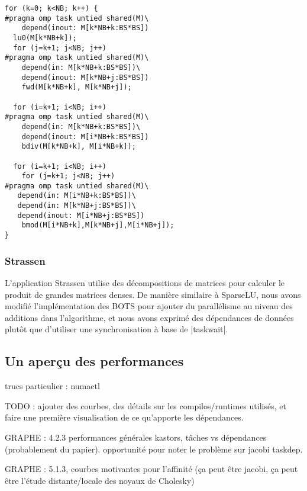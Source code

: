 \begin{lstlisting}[caption=LU utilisant des tâches avec dépendances,label=lst:kastors:sparseLU-deps]
for (k=0; k<NB; k++) {
#pragma omp task untied shared(M)\
    depend(inout: M[k*NB+k:BS*BS])
  lu0(M[k*NB+k]);
  for (j=k+1; j<NB; j++)
#pragma omp task untied shared(M)\
    depend(in: M[k*NB+k:BS*BS])\
    depend(inout: M[k*NB+j:BS*BS])
    fwd(M[k*NB+k], M[k*NB+j]);

  for (i=k+1; i<NB; i++)
#pragma omp task untied shared(M)\
    depend(in: M[k*NB+k:BS*BS])\
    depend(inout: M[i*NB+k:BS*BS])
    bdiv(M[k*NB+k], M[i*NB+k]);

  for (i=k+1; i<NB; i++)
    for (j=k+1; j<NB; j++)
#pragma omp task untied shared(M)\
   depend(in: M[i*NB+k:BS*BS])\
   depend(in: M[k*NB+j:BS*BS])\
   depend(inout: M[i*NB+j:BS*BS])
    bmod(M[i*NB+k],M[k*NB+j],M[i*NB+j]);
}
\end{lstlisting}

\subsubsection{Strassen}\label{sec:kastors:strassen}

L'application Strassen utilise des décompositions de matrices pour calculer le produit de grandes matrices denses.
De manière similaire à SparseLU, nous avons modifié l'implémentation des BOTS pour ajouter du parallélisme au niveau des additions dans l'algorithme, et nous avons exprimé des dépendances de données plutôt que d'utiliser une synchronisation à base de |taskwait|.


\subsection{Un aperçu des performances}

trucs particulier : numactl

TODO : ajouter des courbes, des détails sur les compilos/runtimes utilisés, et faire une première visualisation de ce qu'apporte les dépendances.

GRAPHE : 4.2.3 performances générales kastors, tâches vs dépendances (probablement du papier). opportunité pour noter le problème sur jacobi taskdep.

GRAPHE : 5.1.3, courbes motivantes pour l'affinité (ça peut être jacobi, ça peut être l'étude distante/locale des noyaux de Cholesky)
